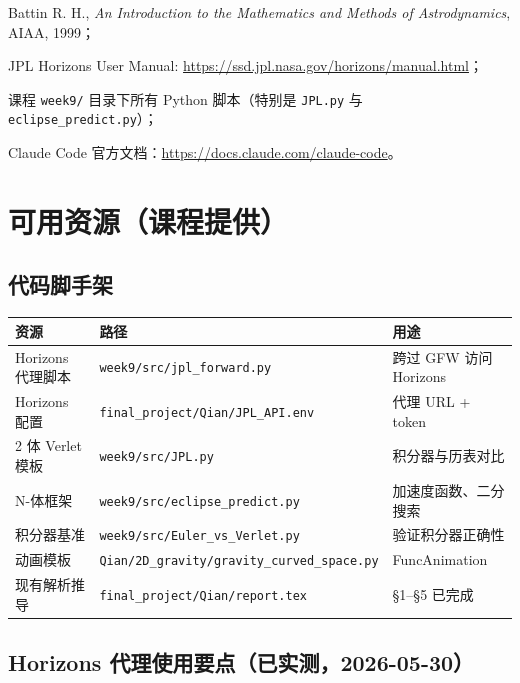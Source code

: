 \documentclass[11pt,a4paper]{ctexart}
\begin{document}
\begin{enumerate}[label={[\arabic*]},start=4]
    \item Battin R. H., \textit{An Introduction to the Mathematics and Methods of Astrodynamics}, AIAA, 1999；
    \item JPL Horizons User Manual: \url{https://ssd.jpl.nasa.gov/horizons/manual.html}；
    \item 课程 \texttt{week9/} 目录下所有 Python 脚本（特别是 \texttt{JPL.py} 与 \texttt{eclipse\_predict.py}）；
    \item Claude Code 官方文档：\url{https://docs.claude.com/claude-code}。
\end{enumerate}

\section{可用资源（课程提供）}\label{sec:resources}

\subsection{代码脚手架}

\begin{longtable}{@{}lll@{}}
\toprule
资源 & 路径 & 用途 \\
\midrule
\endhead
Horizons 代理脚本 & \texttt{week9/src/jpl\_forward.py} & 跨过 GFW 访问 Horizons \\
Horizons 配置     & \texttt{final\_project/Qian/JPL\_API.env} & 代理 URL + token \\
2 体 Verlet 模板  & \texttt{week9/src/JPL.py} & 积分器与历表对比 \\
N-体框架          & \texttt{week9/src/eclipse\_predict.py} & 加速度函数、二分搜索 \\
积分器基准        & \texttt{week9/src/Euler\_vs\_Verlet.py} & 验证积分器正确性 \\
动画模板          & \texttt{Qian/2D\_gravity/gravity\_curved\_space.py} & FuncAnimation \\
现有解析推导      & \texttt{final\_project/Qian/report.tex} & §1--§5 已完成 \\
\bottomrule
\end{longtable}

\subsection{Horizons 代理使用要点（已实测，2026-05-30）}
\end{document}
